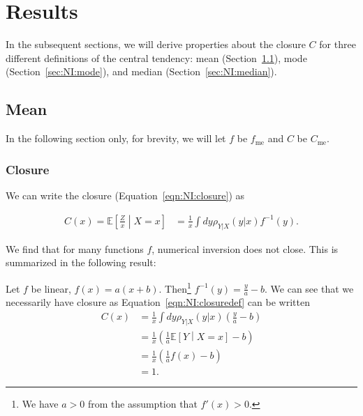 \section{Results}

In the subsequent sections, we will derive properties about the closure $C$ for three different definitions of the central tendency: mean (Section~\ref{sec:NI:mean}), mode (Section~\ref{sec:NI:mode}), and median (Section~\ref{sec:NI:median}).

\subsection{Mean}
\label{sec:NI:mean}

In the following section only, for brevity, we will let $f$ be $f_\text{me}$ and $C$ be $C_\text{me}$.
\subsubsection{Closure}
\label{sec:NI:meanclosuresection}

We can write the closure (Equation~\ref{eqn:NI:closure}) as

\begin{align}
  C(x) = \mathbb{E}\left[\frac{Z}{x}\middle| X=x\right] &=\frac{1}{x} \int dy \rho_{Y|X}(y|x) f^{-1}(y).
\label{eqn:NI:closuredef}
\end{align}

We find that for many functions $f$, numerical inversion does not close. This is summarized in the following result:

\vspace{5mm}


\vspace{5mm}

Let $f$ be linear, $f(x) = a(x+b)$. Then\footnote{We have $a>0$ from the assumption that $f'(x)>0$.} $f^{-1}(y) = \frac{y}{a}-b$. We can see that we necessarily have closure as Equation~\ref{eqn:NI:closuredef} can be written
\begin{align}
  C(x) &=\frac{1}{x} \int dy \rho_{Y|X}(y|x) \left(\frac{y}{a}-b\right)\nonumber\\
&=\frac{1}{x} \left(\frac{1}{a}\mathbb{E}\left[Y\middle| X=x\right]-b\right)\nonumber\\
&=\frac{1}{x} \left(\frac{1}{a}f(x)-b\right)\nonumber\\
&=1.
\label{eqn:NI:closure_linear_proof}
\end{align}


